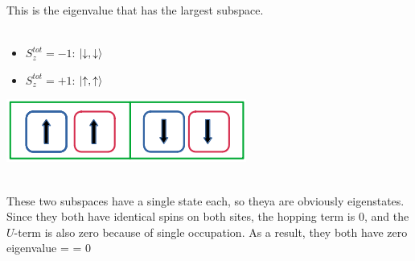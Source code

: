 \documentclass[12pt]{article}
\begin{document}
This is the eigenvalue that has the largest subspace.\\\\
\begin{minipage}{\textwidth/2}
\begin{itemize}
\item \(S_z^{tot} = -1\): \(\ket{\downarrow,\downarrow}\)
\item \(S_z^{tot} = +1\): \(\ket{\uparrow,\uparrow}\)
\end{itemize}
\end{minipage}
\begin{minipage}{\textwidth/2}
	\includegraphics[scale=0.5]{five.png}
\end{minipage}
\vspace*{10pt}\\
These two subspaces have a single state each, so theya are obviously eigenstates. Since they both have identical spins on both sites, the hopping term is 0, and the \(U\)-term is also zero because of single occupation. As a result, they both have zero eigenvalue
\beq
\ham \ket{\downarrow,\downarrow} = \ham \ket{\uparrow,\uparrow} = 0
\eeq
\end{document}
